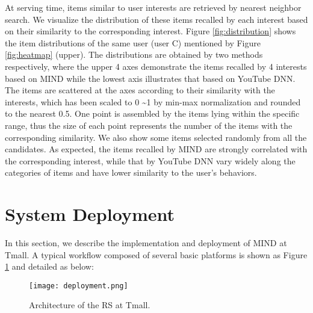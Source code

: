 \documentclass[sigconf]{acmart}
\begin{document}
At serving time, items similar to user interests are retrieved by nearest neighbor search.
We visualize the distribution of these items recalled by each interest based on their similarity to the corresponding interest.
Figure \ref{fig:distribution} shows the item distributions of the same user (user C) mentioned by Figure \ref{fig:heatmap} (upper).
The distributions are obtained by two methods respectively, where the upper 4 axes demonstrate the items recalled by 4 interests based on MIND while the lowest axis illustrates that based on YouTube DNN.
The items are scattered at the axes according to their similarity with the interests, which has been scaled to 0 \textasciitilde 1 by min-max normalization and rounded to the nearest 0.5.
One point is assembled by the items lying within the specific range, thus the size of each point represents the number of the items with the corresponding similarity.
We also show some items selected randomly from all the candidates.
As expected, the items recalled by MIND are strongly correlated with the corresponding interest, while that by YouTube DNN vary widely along the categories of items and have lower similarity to the user's behaviors.

\section{System Deployment}

In this section, we describe the implementation and deployment of MIND at Tmall.
A typical workflow composed of several basic platforms is shown as Figure \ref{fig:deployment} and detailed as below:

\begin{figure}[ht]
  \centering
  \texttt{[image: deployment.png]}
  \caption{Architecture of the RS at Tmall.}
  \label{fig:deployment}
\end{figure}
\end{document}
